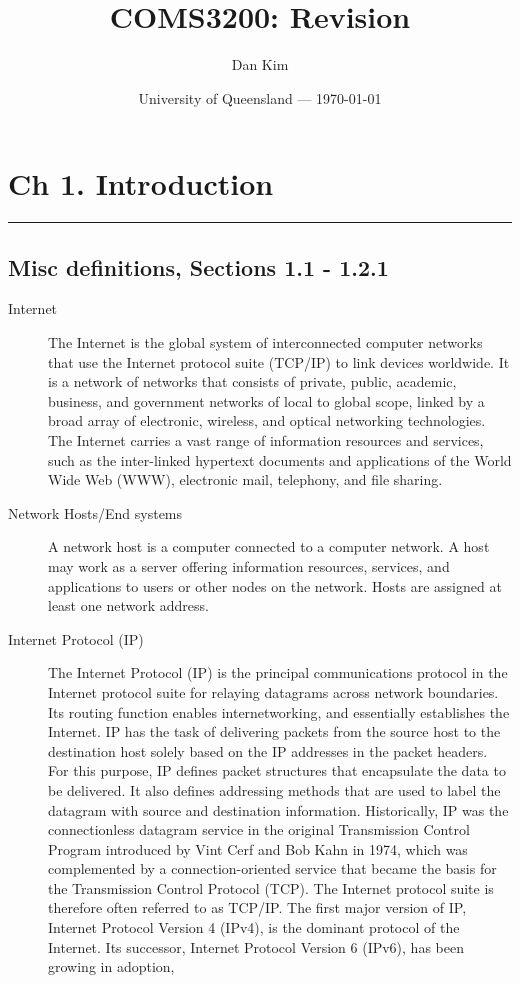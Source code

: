 \documentclass{article}
\title{COMS3200: Revision} %
\author{Dan Kim}
\date{University of Queensland --- \today}
\begin{document}
\maketitle %

\tableofcontents

\section*{Ch 1. Introduction}
\noindent
\rule{\linewidth}{0.5mm}
\noindent

\subsection*{Misc definitions, Sections 1.1 - 1.2.1}
\begin{description}
    \item[Internet] The Internet is the global system of interconnected computer networks that use the Internet protocol suite (TCP/IP) to link devices worldwide. It is a network of networks that consists of private, public, academic, business, and government networks of local to global scope, linked by a broad array of electronic, wireless, and optical networking technologies. The Internet carries a vast range of information resources and services, such as the inter-linked hypertext documents and applications of the World Wide Web (WWW), electronic mail, telephony, and file sharing.
    
    \item[Network Hosts/End systems] A network host is a computer connected to a computer network. A host may work as a server offering information resources, services, and applications to users or other nodes on the network. Hosts are assigned at least one network address.
    
    \item[Internet Protocol (IP)] The Internet Protocol (IP) is the principal communications protocol in the Internet protocol suite for relaying datagrams across network boundaries. Its routing function enables internetworking, and essentially establishes the Internet. IP has the task of delivering packets from the source host to the destination host solely based on the IP addresses in the packet headers. For this purpose, IP defines packet structures that encapsulate the data to be delivered. It also defines addressing methods that are used to label the datagram with source and destination information. Historically, IP was the connectionless datagram service in the original Transmission Control Program introduced by Vint Cerf and Bob Kahn in 1974, which was complemented by a connection-oriented service that became the basis for the Transmission Control Protocol (TCP). The Internet protocol suite is therefore often referred to as TCP/IP. The first major version of IP, Internet Protocol Version 4 (IPv4), is the dominant protocol of the Internet. Its successor, Internet Protocol Version 6 (IPv6), has been growing in adoption, 


\end{description}
\end{document}
